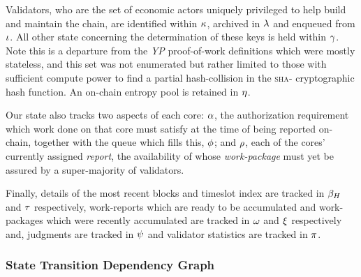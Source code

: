 Validators, who are the set of economic actors uniquely privileged to help build and maintain the \Jam chain, are identified within $\kappa$, archived in $\lambda$ and enqueued from $\iota$. All other state concerning the determination of these keys is held within $\gamma$. Note this is a departure from the \emph{YP} proof-of-work definitions which were mostly stateless, and this set was not enumerated but rather limited to those with sufficient compute power to find a partial hash-collision in the \textsc{sha}- cryptographic hash function. An on-chain entropy pool is retained in $\eta$.

Our state also tracks two aspects of each core: $\alpha$, the authorization requirement which work done on that core must satisfy at the time of being reported on-chain, together with the queue which fills this, $\phi$; and $\rho$, each of the cores' currently assigned \emph{report}, the availability of whose \emph{work-package} must yet be assured by a super-majority of validators.

Finally, details of the most recent blocks and timeslot index are tracked in $\beta_H$ and $\tau$ respectively, work-reports which are ready to be accumulated and work-packages which were recently accumulated are tracked in $\omega$ and $\xi$ respectively and, judgments are tracked in $\psi$ and validator statistics are tracked in $\pi$.

\subsubsection{State Transition Dependency Graph}

